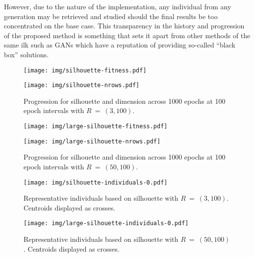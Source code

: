 However, due to the nature of the implementation, any individual from any
generation may be retrieved and studied should the final results be too
concentrated on the base case. This transparency in the history and progression
of the proposed method is something that sets it apart from other methods of the
same ilk such as GANs which have a reputation of providing so-called ``black
box'' solutions.

\begin{figure}[htbp]
    \ContinuedFloat*
    \centering
    \begin{minipage}{\imgwidth}
        \centering
        \texttt{[image: img/silhouette-fitness.pdf]}
    \end{minipage}

    \begin{minipage}{\imgwidth}
        \centering
        \texttt{[image: img/silhouette-nrows.pdf]}
    \end{minipage}
    \caption{Progression for silhouette and dimension across 1000 epochs at 100
             epoch intervals with \(R~=~(3,100)\).}\label{figure:silhouette}
\end{figure}

\begin{figure}[htbp]
    \ContinuedFloat%
    \centering
    \begin{minipage}{\imgwidth}
        \centering
        \texttt{[image: img/large-silhouette-fitness.pdf]}
    \end{minipage}

    \begin{minipage}{\imgwidth}
        \centering
        \texttt{[image: img/large-silhouette-nrows.pdf]}
    \end{minipage}
    \caption{Progression for silhouette and dimension across 1000 epochs at 100
             epoch intervals with
             \(R~=~(50,100)\).}\label{figure:large-silhouette}
\end{figure}

\begin{figure}[htbp]
    \ContinuedFloat*
    \centering
    \texttt{[image: img/silhouette-individuals-0.pdf]}
    \caption{Representative individuals based on silhouette with
             \(R~=~(3,100)\). Centroids displayed as
             crosses.}\label{figure:silhouette-individuals}
\end{figure}

\begin{figure}[htbp]
    \ContinuedFloat%
    \centering
    \texttt{[image: img/large-silhouette-individuals-0.pdf]}
    \caption{Representative individuals based on silhouette with
             \(R~=~(50,100)\). Centroids displayed as
             crosses.}\label{figure:large-silhouette-individuals}
\end{figure}


